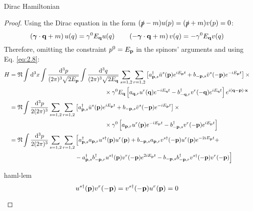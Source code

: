 \begin{proposition}{Dirac Hamiltonian}{}
\begin{proof}
    Using the Dirac equation in the form $ (\slashed{p} - m) u(p) = (\slashed{p} + m) v(p) = 0 $:
    \begin{equation*}
      \left( \boldsymbol{\gamma} \cdot \mathbf{q} + m \right) u(q) = \gamma^0 E_{\mathbf{q}} u(q)
      \qquad
      \left( -\boldsymbol{\gamma} \cdot \mathbf{q} + m \right) v(q) = - \gamma^0 E_{\mathbf{q}} v(q)
    \end{equation*}
    Therefore, omitting the constraint $ p^0 = E_{\mathbf{p}} $ in the spinors' arguments and using Eq. \ref{eq:2.8}:
    \begin{equation*}
      \begin{split}
        H
        &= \mathfrak{N} \int \mathrm{d}^3x \int \frac{\mathrm{d}^3p}{(2\pi)^3 \sqrt{2E_{\mathbf{p}}}} \int \frac{\mathrm{d}^3q}{(2\pi)^3 \sqrt{2E_{\mathbf{q}}}} \sum_{s = 1,2} \sum_{r = 1,2} \left[ a_{\mathbf{p},s}^\dagger \bar{u}^s(\mathbf{p}) e^{i E_{\mathbf{p}} t} + b_{-\mathbf{p},s} \bar{v}^s(-\mathbf{p}) e^{-i E_{\mathbf{p}} t} \right] \times \\
        & \qquad \qquad \qquad \qquad \qquad \qquad \qquad \qquad \times \gamma^0 E_{\mathbf{q}} \left[ a_{\mathbf{q},r} u^r(\mathbf{q}) e^{-i E_{\mathbf{q}} t} - b_{-\mathbf{q},r}^\dagger v^r(-\mathbf{q}) e^{i E_{\mathbf{q}} t} \right] e^{i (\mathbf{q} - \mathbf{p}) \cdot \mathbf{x}} \\
        &= \mathfrak{N} \int \frac{\mathrm{d}^3p}{2(2\pi)^3} \sum_{s = 1,2} \sum_{r = 1,2} \left[ a_{\mathbf{p},s}^\dagger \bar{u}^s(\mathbf{p}) e^{i E_{\mathbf{p}} t} + b_{-\mathbf{p},s} \bar{v}^s(-\mathbf{p}) e^{-i E_{\mathbf{p}} t} \right] \times \\
        & \qquad \qquad \qquad \qquad \qquad \qquad \qquad \qquad \times \gamma^0 \left[ a_{\mathbf{p},r} u^r(\mathbf{p}) e^{-i E_{\mathbf{p}} t} - b_{-\mathbf{p},s}^\dagger v^r(-\mathbf{p}) e^{i E_{\mathbf{p}} t} \right] \\
        &= \mathfrak{N} \int \frac{\mathrm{d}^3p}{2(2\pi)^3} \sum_{s = 1,2} \sum_{r = 1,2} \Big[ a_{\mathbf{p},s}^\dagger a_{\mathbf{p},r} u^{s\dagger}(\mathbf{p}) u^r(\mathbf{p}) + b_{-\mathbf{p},s} a_{\mathbf{p},r} v^{s\dagger}(-\mathbf{p}) u^r(\mathbf{p}) e^{-2i E_{\mathbf{p}} t} + \\
        & \qquad \qquad \qquad \qquad \qquad \quad - a_{\mathbf{p},s}^\dagger b_{-\mathbf{p},r}^\dagger u^{s\dagger}(\mathbf{p}) v^r(-\mathbf{p}) e^{2i E_{\mathbf{p}} t} - b_{-\mathbf{p},s} b_{-\mathbf{p},r}^\dagger v^{s\dagger}(-\mathbf{p}) v^r(-\mathbf{p}) \Big]
      \end{split}
    \end{equation*}

    \begin{lemma}{}{haml-lem}
      \begin{equation*}
        u^{s\dagger}(\mathbf{p}) v^r(-\mathbf{p}) = v^{s\dagger}(-\mathbf{p}) u^r(\mathbf{p}) = 0
      \end{equation*}
    \end{lemma}


\end{proof}
\end{proposition}
